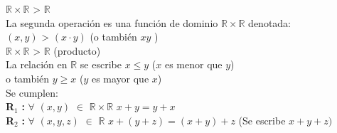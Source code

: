 \documentclass[12pt]{article}
\begin{document}
$\mathbb{R} \times \mathbb{R}$ \hspace{.1cm} \textendash\textendash\textendash\textendash \textendash\textendash\textendash\textendash\textendash\textendash\textendash\textendash \textendash\textendash\textendash\textendash   \textgreater \hspace{.1cm} $\mathbb{R}$ \\

La segunda operación es una función de dominio $\mathbb{R} \times \mathbb{R}$ denotada:\\

$(x,y)$ \hspace{.1cm} \textendash\textendash\textendash\textendash \textendash\textendash\textendash\textendash\textendash\textendash\textendash\textendash \textendash\textendash\textendash\textendash   \textgreater \hspace{.1cm} $ (x\cdot y) $\hspace{.1cm} (o también $xy$ )\\

$\mathbb{R} \times \mathbb{R}$ \hspace{.1cm} \textendash\textendash\textendash\textendash \textendash\textendash\textendash\textendash\textendash\textendash\textendash\textendash \textendash\textendash\textendash\textendash   \textgreater \hspace{.1cm} $\mathbb{R}$ \hspace{0.1cm} (producto)\\

La relación en $\mathbb{R}$ se escribe $x \leq y$ \hspace{0.1cm} ($x$ es menor que $y$) \\

\hspace{3cm} o también \hspace{0.15cm} $y \geq x$  \hspace{0.1cm} ($y$ es mayor que $x$) \\

Se cumplen:\\

\textbf{R}$_1$ \hspace{0.1cm}\textbf{:} $\forall$ $ ( x , y ) $ $\in$ $\mathbb{R} \times \mathbb{R}$ \hspace{0.1 cm} $x+y = y+x$ \\

\textbf{R}$_2$ \hspace{0.1cm}\textbf{:} $\forall$ $ ( x , y, z ) $ $\in$ $\mathbb{R}$ \hspace{0.1 cm} $x+(y+z) = (x+y)+z$ \hspace{0.1 cm} (Se escribe $x+y+z)$ \\
\end{document}
